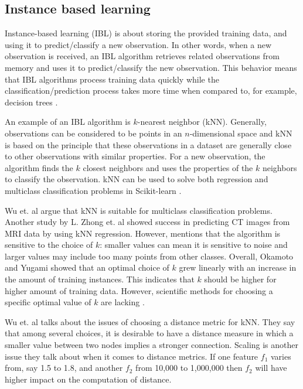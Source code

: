	\subsection{Instance based learning} \label{sec:knn}
	Instance-based learning (IBL) is about storing the provided training data, and using it to predict/classify a new observation. In other words, when a new observation is received, an IBL algorithm retrieves related observations from memory and uses it to predict/classify the new observation. This behavior means that IBL algorithms process training data quickly while the classification/prediction process takes more time when compared to, for example, decision trees \cite{ARTICLE:8}. 

	An example of an IBL algorithm is $k$-nearest neighbor (kNN). Generally, observations can be considered to be points in an $n$-dimensional space and kNN is based on the principle that these observations in a dataset are generally close to other observations with similar properties.  For a new observation, the algorithm finds the $k$ closest neighbors and uses the properties of the $k$ neighbors to classify the observation. kNN can be used to solve both regression and multiclass classification problems in Scikit-learn \cite{WEBSITE:17, WEBSITE:18}.

	Wu et. al \cite{ARTICLE:9} argue that kNN is suitable for multiclass classification problems. Another study by L. Zhong et. al \cite{IP:3} showed success in predicting CT images from MRI data by using kNN regression. However, \cite{ARTICLE:9} mentions that the algorithm is sensitive to the choice of $k$: smaller values can mean it is sensitive to noise and larger values may include too many points from other classes. Overall, Okamoto and Yugami \cite{ARTICLE:12} showed that an optimal choice of $k$ grew linearly with an increase in the amount of training instances. This indicates that $k$ should be higher for higher amount of training data. However, scientific methods for choosing a specific optimal value of $k$  are lacking \cite{ARTICLE:7}.

	Wu et. al \cite{ARTICLE:9} talks about the issues of choosing a distance metric for kNN. They say that among several choices, it is desirable to have a distance measure in which a smaller value between two nodes implies a stronger connection. Scaling is another issue they talk about when it comes to distance metrics. If one feature $f_1$ varies from, say 1.5 to 1.8, and another $f_2$ from 10,000 to 1,000,000 then $f_2$ will have higher impact on the computation of distance. 
	
